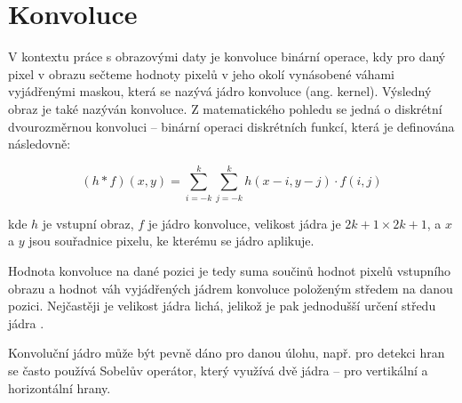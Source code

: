 
\section{Konvoluce}

V kontextu práce s obrazovými daty je konvoluce binární operace, kdy pro daný pixel
v obrazu sečteme hodnoty pixelů v jeho okolí vynásobené váhami vyjádřenými
maskou, která se nazývá jádro konvoluce (ang. kernel). Výsledný obraz je také
nazýván konvoluce. Z matematického pohledu se jedná o diskrétní dvourozměrnou
konvoluci – binární operaci diskrétních funkcí, která je definována následovně:

\begin{equation*}
    (h*f)(x,y)=\sum _{i=-k}^{k}\sum _{j=-k}^{k}h(x-i,y-j)\cdot f(i,j)
\end{equation*}

kde $h$ je vstupní obraz, $f$ je jádro konvoluce, velikost jádra je $2k+1
    \times 2k+1$, a $x$ a $y$ jsou souřadnice pixelu, ke kterému se jádro aplikuje.

Hodnota konvoluce na dané pozici je tedy suma součinů hodnot pixelů vstupního
obrazu a hodnot váh vyjádřených jádrem konvoluce položeným středem na danou
pozici.
Nejčastěji je velikost jádra lichá,
jelikož je pak jednodušší určení středu jádra \cite{cnn_introduction}.



Konvoluční jádro může být pevně dáno pro danou úlohu, např. pro detekci hran se
často používá Sobelův operátor, který využívá dvě jádra – pro vertikální a
horizontální hrany. 

